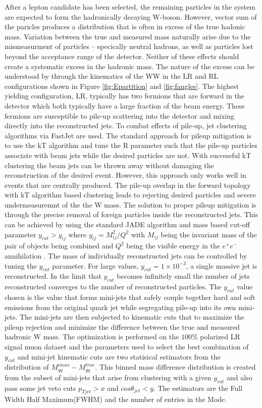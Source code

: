 After a lepton candidate has been selected, the remaining particles in the system are expected to form the hadronically decaying W-boson. However, vector sum of the paricles  produces a distribution that is often in excess of the true hadonic mass. Variation between the true and measured mass naturally arise due to the mismeasurment of particles -- specically neutral hadrons, as well as particles lost beyond the acceptance range of the detector. Neither of these effects should create a systematic excess in the hadronic mass. The nature of the excess can be understood by through the kinematics of the WW in the LR and RL configurations shown in Figure \ref{fig:Epartition} and \ref{fig:fangles}. The highest yielding configuration, LR, typically has two fermions that are forward in the detector which both typically have a large fraction of the beam energy. These fermions are susceptible to pile-up scattering into the detector and mixing directly into the reconstructed jets. To combat effects of pile-up, jet clustering algorithms via FastJet\cite{fastjet} are used.  The standard approach for pileup mitigation is to use the kT algorithm\cite{kt} and tune the R parameter such that the pile-up particles associate with beam jets while the desired particles are not. With successful kT clustering the beam jets can be thrown away without damaging the reconstruction of the desired event. However, this approach only works well in events that are centrally produced.  The pile-up overlap in the forward topology with kT algorithm  based clustering leads to rejecting desired particles and severe undermeasuremnt of the the W mass. The solution to proper pileup mitigation is through the precise removal of foreign particles inside the reconstructed jets.  This can be achieved by using the standard JADE algorithm and mass based cut-off parameter $y_{cut} > y_{ij}$ where $y_{ij} = M_{ij}^2 / Q^2$ with $M_{ij}$ being the invariant mass of the pair of objects being combined and $Q^2$ being the visible energy in the $e^{+}e^{-}$ annihilation \cite{ycut}.  The mass of individually reconstructed jets can be controlled by tuning the $y_{cut}$ parameter. For large values, $y_{cut} =1\times10^{-3}$, a single massive jet is reconstructed. In the limit that $y_{cut}$ becomes infinitely small the number of jets reconstructed converges to the number of reconstructed particles.  The $y_{cut}$ value  chosen is the value that forms mini-jets that safely couple together hard and soft emissions from  the original quark jet while segregating pile-up into its own mini-jets. The mini-jets are then subjected to kinematic cuts that to maximize the pileup rejection and minimize the difference  between the true and measured hadronic W mass. The optimization is performed on the $100\%$ polarized LR signal muon dataset and the parameters used to select the best combination of $y_{cut}$ and mini-jet kinematic cuts are two statisical estimators from the distribution of $M_{qq}^{meas} - M_{qq}^{true}$. This binned mass difference distribution is created from the subset of mini-jets that arise from clustering with a given $y_{cut}$ and also pass some jet veto cuts $p_{Tjet} > x$ and $cos\theta_{jet} < y$. The estimators are the Full Width Half Maximum(FWHM) and the number of entries in the Mode.  
